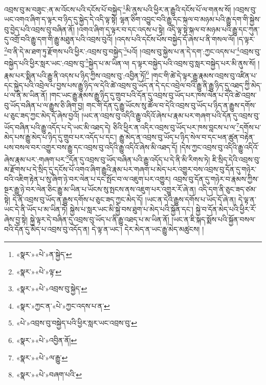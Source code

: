 འབྲས་བུ་མ་བཟུང་:ན་མ་འོངས་པའི་དངོས་པོ་བསྐྱེད་\footnote{«སྣར་»«པེ་»ན་སྐྱེད་}མི་ནུས་པའི་ཕྱིར་ན་རྒྱུའི་དངོས་པོ་ལ་གནས་སོ། །འབྲས་བུ་ཡང་འགའ་ཞིག་ད་ལྟར་བ་ཉིད་དུ་སྐྱེད་དེ་འདི་ལྟ་སྟེ། ལྷན་ཅིག་འབྱུང་བའི་རྒྱུ་དང་སྐལ་བ་མཉམ་པའི་རྒྱུ་དག་གི་སྐྱེས་བུ་བྱེད་པའི་འབྲས་བུ་བཞིན་ནོ། །འགའ་ཞིག་ད་ལྟར་བ་དང་འདས་པ་སྟེ། འདི་ལྟ་སྟེ་སྐལ་བ་མཉམ་པའི་རྒྱུ་དང་ཀུན་དུ་འགྲོ་བའི་རྒྱུ་དག་གི་རྒྱུ་མཐུན་པའི་འབྲས་བུའོ། །འདས་པའི་དངོས་པོས་བསྐྱེད་དོ་ཞེས་པ་ནི་གསལ་ལོ། །ད་ལྟར་\footnote{«སྣར་»«པེ་»ལྟ་}བ་ནི་དེ་མ་ཐག་ཏུ་རྫོགས་པའི་ཕྱིར་:འབྲས་བུ་བསྐྱེད་\footnote{«སྣར་»«པེ་»འབྲས་བུ་སྐྱེད་}པའོ། །འབྲས་བུ་སྐྱེས་པ་ན་དེ་དག་:ཀྱང་འདས་པ་\footnote{«སྣར་»ཀྱང་ན་«པེ་»ཀྱང་འདས་པ་ན་}འབྲས་བུ་བསྐྱེད་པའི་ཕྱིར་སླར་ཡང་:འབྲས་བུ་\footnote{«པེ་»འབྲས་བུ་བསྐྱེད་པའི་ཕྱིར་སླར་ཡང་འབྲས་བུ་}སྐྱེད་པ་མ་ཡིན་ལ། ད་ལྟར་བསྐྱེད་པའི་འབྲས་བུ་སླར་བསྐྱེད་པར་མི་ནུས་སོ། །རྣམ་པར་སྨིན་པའི་རྒྱུ་ནི་འདས་པ་ཉིད་ཀྱིས་འབྲས་བུ་:འབྱིན་ཏོ།\footnote{«སྣར་»«པེ་»འབྱིན་ནོ།} །གང་གི་ཚེ་དེ་ལྟར་རྒྱུ་རྣམས་འབྲས་བུ་འཛིན་པ་དང་སྐྱེད་པའི་འབྲེལ་པ་བྱས་པས་རྒྱུ་ཉིད་ལ་དེའི་ཚེ་འབྲས་བུ་ཡོད་ན་དེ་དང་འབྲེལ་བའི་རྒྱུ་ནི་རྒྱུ་ཉིད་དུ་འཐད་ཀྱི་མེད་པ་ལ་ནི་མ་ཡིན་ནོ། །གང་ཡང་རྒྱུ་རྣམས་རྒྱུ་ཉིད་དུ་གྲུབ་པའི་དོན་དུ་འབྲས་བུ་ཡོད་པར་ཁས་ལེན་པ་དེའི་ཚེ་འབྲས་བུ་ཡོད་བཞིན་པ་ལ་རྒྱུས་ཅི་ཞིག་བྱ། གང་གི་དོན་དུ་རྒྱུ་ཡོངས་སུ་ཚོལ་བ་དེའི་འབྲས་བུ་ཡོད་པ་ཉིད་ན་རྒྱུས་དགོས་པ་ཅུང་ཟད་ཀྱང་མེད་དོ་ཞེས་བྱའོ། །ཡང་ན་འབྲས་བུ་འདིའི་རྒྱུ་འདིའོ་ཞེས་པ་རྣམ་པར་གཞག་པའི་དོན་དུ་འབྲས་བུ་ཡོད་བཞིན་པའི་རྒྱུ་འདོད་པ་དེ་ཡང་མི་འཐད་དེ། ཅིའི་ཕྱིར་ན་འདིར་འབྲས་བུ་ཡོད་པར་ཁས་བླངས་པ་ལ་\footnote{«སྣར་»«པེ་»ལ་རྒྱུ་}དགོས་པ་མེད་པས་རྒྱུ་མེད་པ་ཉིད་དུ་གྲུབ་པར་འདོད་པ་དང་། རྒྱུ་མེད་ན་འབྲས་བུ་ཡོད་པ་ཉིད་སེལ་བ་དང་ཕན་ཚུན་བརྟེན་པས་བསལ་བར་འགྱུར་བས་རྒྱུ་དང་འབྲས་བུ་འདིའི་རྒྱུ་འདིའོ་ཞེས་མི་འཐད་དོ། །དེས་ཀྱང་འབྲས་བུ་འདིའི་རྒྱུ་འདིའོ་ཞེས་རྣམ་པར་:གཞག་པར་\footnote{«སྣར་»«པེ་»བཞག་པའི་}དོན་དུ་འབྲས་བུ་ཡོད་བཞིན་པའི་རྒྱུ་འདོད་པ་དེ་ནི་མི་རིགས་ཏེ། ཇི་སྲིད་དེའི་འབྲས་བུ་མ་རྫོགས་པ་དེ་སྲིད་དུ་དངོས་པོ་འགའ་ཞིག་རྒྱུའི་རྣམ་པར་གཞག་པ་མེད་པར་འགྱུར་བས་འབྲས་བུ་དོན་དུ་གཉེར་བའི་འཇིག་རྟེན་པ་སུ་ཞིག་ཉེ་བར་ལེན་པ་དང་སྤོང་བ་ལ་འཇུག་པར་འགྱུར། འབྲས་བུ་དོན་དུ་གཉེར་བ་རྣམས་ཀྱིས་སྔར་རྒྱུ་ཉེ་བར་ལེན་ཅིང་རྒྱུ་མ་ཡིན་པ་ཡོངས་སུ་སྤངས་ནས་འཇུག་པར་འགྱུར་རོ་ཞེ་ན། འདི་དག་ནི་ཅུང་ཟད་ཙམ་སྟེ། དེ་ནི་འབྲས་བུ་ཡོད་ན་རྒྱུས་དགོས་པ་ཅུང་ཟད་ཀྱང་མེད་དོ། །ཡང་ན་དེའི་རྒྱུས་དགོས་པ་ཡོད་དོ་ཞེ་ན། དེ་ལྟ་ན་ཡང་དེ་ནི་ཡོད་པ་མ་ཡིན་ཏེ། སྐྱེས་པ་སླར་ཡང་མི་སྐྱེ་བས་ཐུག་པ་མེད་པའི་སྐྱོན་དང་། སྐྱེ་བ་དོན་མེད་པའི་ཕྱིར་རོ་ཞེས་བྱ་སྟེ། སྐྱེ་ལྟར་དེ་བཞིན་དུ་འབྲས་བུ་ཡོད་པ་ནི་རྒྱུ་འཐད་པ་མ་ཡིན་ནོ། །ཡང་ན་ཇི་སྐད་སྨོས་པའི་སྐྱོན་བསལ་བའི་དོན་དུ་མེད་པ་འབྲས་བུ་འདོད་ན། དེ་ལྟ་ན་ཡང་། དེར་མེད་ན་ཡང་རྒྱུ་མེད་མཚུངས། །
